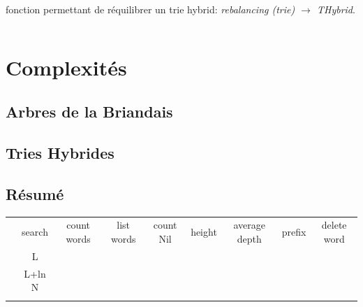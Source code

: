 \documentclass[a4paper,8pt]{report}
\begin{document}
fonction permettant de r\'equilibrer un trie hybrid: \textit{rebalancing (trie) $\rightarrow$ THybrid}.
\begin{verbatim}
\end{verbatim}

\chapter{Complexit\'es}
\section*{Arbres de la Briandais}\label{sec:name}
\section*{Tries Hybrides}\label{sec:name}
\section*{R\'esum\'e}\label{sec:name}

\begin{table}[h]
\begin{tabular}{ccccccccc}
                                                           & \cellcolor[HTML]{C0C0C0}search & \cellcolor[HTML]{C0C0C0}count words & \cellcolor[HTML]{C0C0C0}list words & \cellcolor[HTML]{C0C0C0}count Nil & \cellcolor[HTML]{C0C0C0}height & \cellcolor[HTML]{C0C0C0}average depth & \cellcolor[HTML]{C0C0C0}prefix & \cellcolor[HTML]{C0C0C0}delete word \\
\cellcolor[HTML]{C0C0C0}{\color[HTML]{656565} Briandais}   & \cellcolor[HTML]{EFEFEF}L      &                                     & \cellcolor[HTML]{EFEFEF}           &                                   & \cellcolor[HTML]{EFEFEF}       &                                       & \cellcolor[HTML]{EFEFEF}       &                                     \\
\cellcolor[HTML]{C0C0C0}{\color[HTML]{656565} Hybrid Trie} & \cellcolor[HTML]{EFEFEF}L+ln N &                                     & \cellcolor[HTML]{EFEFEF}           &                                   & \cellcolor[HTML]{EFEFEF}       &                                       & \cellcolor[HTML]{EFEFEF}       &                                     \\
                                                           &                                &                                     &                                    &                                   &      
\end{tabular}
\end{table}
\end{document}
